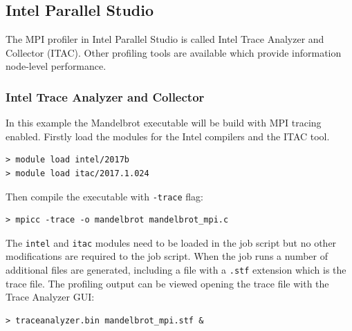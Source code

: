 \documentclass[a4paper,titlepage]{article}
\begin{document}

\subsection{Intel Parallel Studio}

The MPI profiler in Intel Parallel Studio is called Intel Trace Analyzer and Collector (ITAC). Other profiling tools are available which provide information node-level performance.

\subsubsection{Intel Trace Analyzer and Collector}

In this example the Mandelbrot executable will be build with MPI tracing enabled. Firstly load the modules for the Intel compilers and the ITAC tool. 
\begin{verbatim}
> module load intel/2017b
> module load itac/2017.1.024
\end{verbatim}
Then compile the executable with \texttt{-trace} flag:
\begin{verbatim}
> mpicc -trace -o mandelbrot mandelbrot_mpi.c
\end{verbatim}
The \texttt{intel} and \texttt{itac} modules need to be loaded in the job script but no other modifications are required to the job script. When the job runs a number of additional files are generated, including a file with a \texttt{.stf} extension which is the trace file.
The profiling output can be viewed opening the trace file with the Trace Analyzer GUI:
\begin{verbatim}
> traceanalyzer.bin mandelbrot_mpi.stf &
\end{verbatim}
\end{document}
